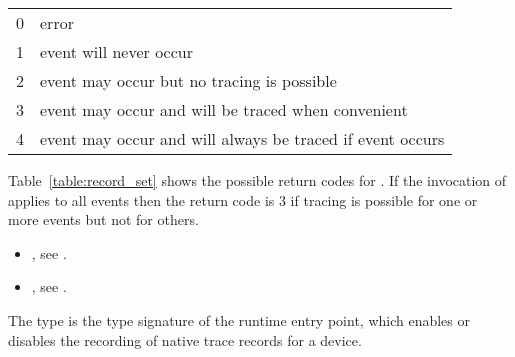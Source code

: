 \nolinenumbers
\renewcommand{\arraystretch}{1.5}
\tablelasttail{\hline}
\begin{supertabular}{p{2.0in} p{3.0in}}
0 & error\\
1 & event will never occur\\
2 & event may occur but no tracing is possible\\
3 & event may occur and will be traced when convenient\\
4 & event may occur and will always be traced if event occurs\\
\end{supertabular}

\linenumbers

\effect
Table~\ref{table:record_set} shows the possible return codes for 
. If the invocation of  
applies to all events then the return code is 3 if tracing is possible for 
one or more events but not for others.

\crossreferences
\begin{itemize}
\item {}, see .

\item {}, see .
\end{itemize}



\label{sec:ompt_set_trace_native_t}

\summary
The  type is the type signature of the 
 runtime entry point, which enables or disables 
the recording of native trace records for a device.

